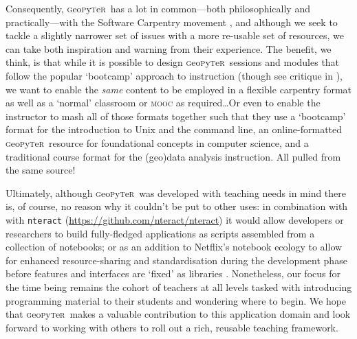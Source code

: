 \documentclass[letter, 11pt]{article}
\newcommand{\gp}{\textsc{g}eo\textsc{p}y\textsc{t}e\textsc{r}~\/}
\begin{document}
Consequently, \gp has a lot in common---both philosophically and
practically---with the Software Carpentry movement \citep{SCF2016}, and although
we seek to tackle a slightly narrower set of issues with a more re-usable set of
resources, we can take both inspiration and warning from their experience. The
benefit, we think, is that while it is possible to design \gp sessions and
modules that follow the popular `bootcamp' approach to instruction (though see
critique in \citealp{Feldon2017}), we want to enable the \textit{same} content
to be employed in a flexible carpentry format as well as a `normal' classroom or
\textsc{mooc} as required\ldots Or even to enable the instructor to mash all of
those formats together such that they use a `bootcamp' format for the
introduction to Unix and the command line, an online-formatted \gp resource for
foundational concepts in computer science, and a traditional course format for
the (geo)data analysis instruction. All pulled from the same source!

Ultimately, although \gp was developed with teaching needs in mind there is, of
course, no reason why it couldn't be put to other uses: in combination with with
\texttt{nteract} (\url{https://github.com/nteract/nteract}) it would allow
developers or researchers to build fully-fledged applications as scripts
assembled from a collection of notebooks; or as an addition to Netflix's
notebook ecology to allow for enhanced resource-sharing and standardisation
during the development phase before features and interfaces are `fixed' as
libraries \citep{Ufford2018}. Nonetheless, our focus for the time being remains
the cohort of teachers at all levels tasked with introducing programming
material to their students and wondering where to begin. We hope that \gp makes
a valuable contribution to this application domain and look forward to working
with others to roll out a rich, reusable teaching framework.



\end{document}
